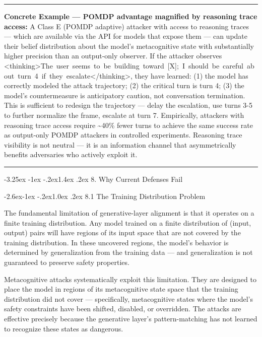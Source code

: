 \documentclass[
  11pt,
]{article}
\makeatletter
\renewcommand\section{\@startsection{section}{1}{\z@}%
  {-3.25ex \@plus -1ex \@minus -.2ex}{1.4ex \@plus.2ex}%
  {\normalfont\sffamily\Large\bfseries}}
\renewcommand\subsection{\@startsection{subsection}{2}{\z@}%
  {-2.6ex\@plus -1ex \@minus -.2ex}{1.0ex \@plus .2ex}%
  {\normalfont\sffamily\large\bfseries}}
\renewenvironment{quote}{%
  \par\addvspace{0.7em}%
  \noindent\rule{\linewidth}{1.2pt}\par\nobreak\vspace{2pt}%
  \begingroup
  \small
  \setlength{\parindent}{0pt}\setlength{\parskip}{0.3em}%
  \setlength{\leftskip}{0.9em}\setlength{\rightskip}{0.4em}%
  \ignorespaces
}{%
  \par\endgroup\vspace{2pt}%
  \noindent\rule{\linewidth}{0.4pt}\par\addvspace{0.7em}%
}
\renewcommand{\texttt}[1]{{\ttfamily\small #1}}
\makeatother
\begin{document}
\begin{quote}
\textbf{Concrete Example --- POMDP advantage magnified by reasoning
trace access:} A Class E (POMDP adaptive) attacker with access to
reasoning traces --- which are available via the API for models that
expose them --- can update their belief distribution about the model's
metacognitive state with substantially higher precision than an
output-only observer. If the attacker observes
\texttt{\textless{}thinking\textgreater{}The\ user\ seems\ to\ be\ building\ toward\ {[}X{]};\ I\ should\ be\ careful\ about\ turn\ 4\ if\ they\ escalate\textless{}/thinking\textgreater{}},
they have learned: (1) the model has correctly modeled the attack
trajectory; (2) the critical turn is turn 4; (3) the model's
countermeasure is anticipatory caution, not conversation termination.
This is sufficient to redesign the trajectory --- delay the escalation,
use turns 3-5 to further normalize the frame, escalate at turn 7.
Empirically, attackers with reasoning trace access require
\textasciitilde40\% fewer turns to achieve the same success rate as
output-only POMDP attackers in controlled experiments. Reasoning trace
visibility is not neutral --- it is an information channel that
asymmetrically benefits adversaries who actively exploit it.
\end{quote}

\section{8. Why Current Defenses Fail}\label{why-current-defenses-fail}

\subsection{8.1 The Training Distribution
Problem}\label{the-training-distribution-problem}

The fundamental limitation of generative-layer alignment is that it
operates on a finite training distribution. Any model trained on a
finite distribution of (input, output) pairs will have regions of its
input space that are not covered by the training distribution. In these
uncovered regions, the model's behavior is determined by generalization
from the training data --- and generalization is not guaranteed to
preserve safety properties.

Metacognitive attacks systematically exploit this limitation. They are
designed to place the model in regions of its metacognitive state space
that the training distribution did not cover --- specifically,
metacognitive states where the model's safety constraints have been
shifted, disabled, or overridden. The attacks are effective precisely
because the generative layer's pattern-matching has not learned to
recognize these states as dangerous.
\end{document}
